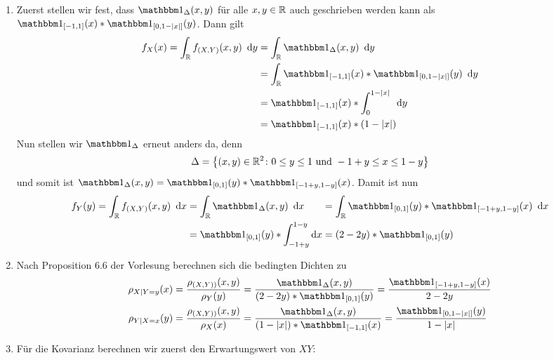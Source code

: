 \begin{exercisePage}
	\begin{enumerate}[leftmargin=*, label=(zu \alph*)]
		\item Zuerst stellen wir fest, dass $\one_\Delta(x,y)$ für alle $x,y \in \mathbb{R}$ auch geschrieben werden kann als $\one_{[-1,1]}(x) * \one_{[0,1-\abs{x}]}(y)$. Dann gilt
		\begin{equation*}
		\begin{aligned}
			f_X(x) = \int_\R f_{(X,Y)}(x,y) \dy &= \int_\R \one_\Delta(x,y) \dy \\ 
			&= \int_\R \one_{[-1,1]}(x) * \one_{[0,1-\abs{x}]}(y) \dy \\
			&= \one_{[-1,1]}(x) * \int_0^{1-\abs{x}} \dy \\
			&= \one_{[-1,1]}(x) * (1 - \abs{x})
		\end{aligned}
		\end{equation*}
		Nun stellen wir $\one_\Delta$ erneut anders da, denn 
		\begin{equation*}
			\Delta = \left\{ (x,y) \in \mathbb{R}^2 \colon 0 \le y \le 1 \text{ und } -1 + y \le x \le 1-y \right\}
		\end{equation*}
		und somit ist $\one_\Delta(x,y) = \one_{[0,1]}(y) * \one_{[-1+y,1-y]}(x)$.
		Damit ist nun
		\begin{equation*}
		\begin{alignedat}[t]{2}
			f_Y(y) = \int_\R f_{(X,Y)}(x,y) \dx 
			&= \int_\R \one_\Delta(x,y) \dx 
			&&= \int_{\R} \one_{[0,1]}(y) * \one_{[-1+y,1-y]}(x) \dx \\
			&= \one_{[0,1]}(y) * \int_{-1+y}^{1-y} \!\!\! \dx 
			&&= (2 - 2y) * \one_{[0,1]}(y)
		\end{alignedat}
		\end{equation*}
		\item Nach Proposition 6.6 der Vorlesung berechnen sich die bedingten Dichten zu
		\begin{equation*}
		\begin{aligned}
			\rho_{X \mid Y = y}(x) &= \frac{\rho_{(X,Y))}(x,y)}{\rho_Y(y)} 
			= \frac{\one_\Delta(x,y)}{(2-2y) * \one_{[0,1]}(y)}
			= \frac{\one_{[-1+y,1-y]}(x)}{2-2y} \\
			\rho_{Y \mid X = x}(y) &= \frac{\rho_{(X,Y))}(x,y)}{\rho_X(x)} 
			= \frac{\one_\Delta(x,y)}{(1 - \abs{x}) * \one_{[-1,1]}(x)}
			= \frac{\one_{[0,1-\abs{x}]}(y)}{1-\abs{x}}
		\end{aligned}
		\end{equation*}
		\item Für die Kovarianz berechnen wir zuerst den Erwartungswert von $XY$:

\end{enumerate}
\end{exercisePage}
